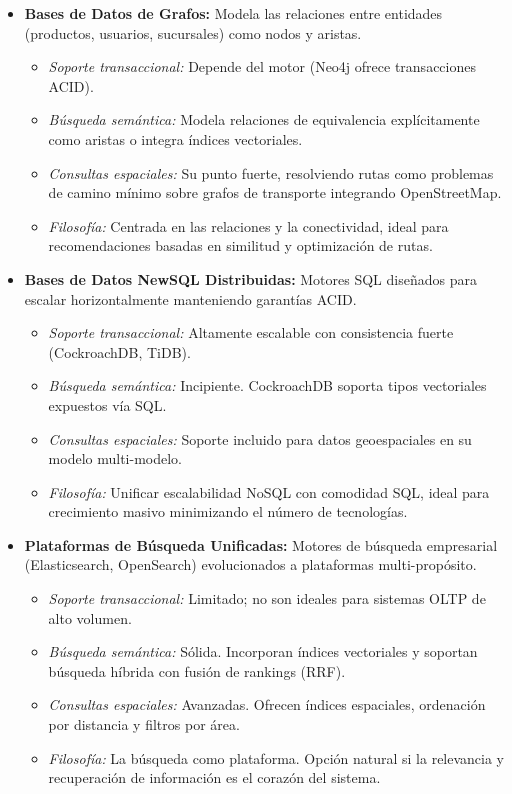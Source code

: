 \begin{tcolorbox}[colback=responsecolor, title=Insights de DeepSeek, colframe=gray!60!black, breakable]
\begin{itemize}
		\item \textbf{Bases de Datos de Grafos:} 
		Modela las relaciones entre entidades (productos, usuarios, sucursales) como nodos y aristas.
		\begin{itemize}
			\item \textit{Soporte transaccional:} Depende del motor (Neo4j ofrece transacciones ACID).
			\item \textit{Búsqueda semántica:} Modela relaciones de equivalencia explícitamente como aristas o integra índices vectoriales.
			\item \textit{Consultas espaciales:} Su punto fuerte, resolviendo rutas como problemas de camino mínimo sobre grafos de transporte integrando OpenStreetMap.
			\item \textit{Filosofía:} Centrada en las relaciones y la conectividad, ideal para recomendaciones basadas en similitud y optimización de rutas.
		\end{itemize}
		
		\item \textbf{Bases de Datos NewSQL Distribuidas:} 
		Motores SQL diseñados para escalar horizontalmente manteniendo garantías ACID.
		\begin{itemize}
			\item \textit{Soporte transaccional:} Altamente escalable con consistencia fuerte (CockroachDB, TiDB).
			\item \textit{Búsqueda semántica:} Incipiente. CockroachDB soporta tipos vectoriales expuestos vía SQL.
			\item \textit{Consultas espaciales:} Soporte incluido para datos geoespaciales en su modelo multi-modelo.
			\item \textit{Filosofía:} Unificar escalabilidad NoSQL con comodidad SQL, ideal para crecimiento masivo minimizando el número de tecnologías.
		\end{itemize}
		
		\item \textbf{Plataformas de Búsqueda Unificadas:} 
		Motores de búsqueda empresarial (Elasticsearch, OpenSearch) evolucionados a plataformas multi-propósito.
		\begin{itemize}
			\item \textit{Soporte transaccional:} Limitado; no son ideales para sistemas OLTP de alto volumen.
			\item \textit{Búsqueda semántica:} Sólida. Incorporan índices vectoriales y soportan búsqueda híbrida con fusión de rankings (RRF).
			\item \textit{Consultas espaciales:} Avanzadas. Ofrecen índices espaciales, ordenación por distancia y filtros por área.
			\item \textit{Filosofía:} La búsqueda como plataforma. Opción natural si la relevancia y recuperación de información es el corazón del sistema.
		\end{itemize}
		
	\end{itemize}
\end{tcolorbox}

